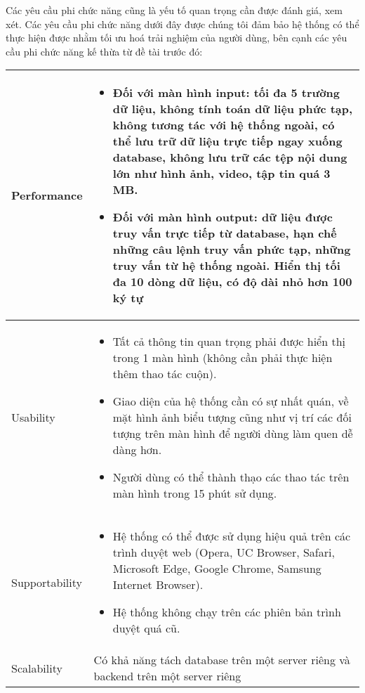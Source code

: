 Các yêu cầu phi chức năng cũng là yếu tố quan trọng cần được đánh giá, xem xét. Các yêu cầu phi chức năng dưới đây được chúng tôi đảm bảo hệ thống có thể thực hiện được nhằm tối ưu hoá trải nghiệm của người dùng, bên cạnh các yêu cầu phi chức năng kế thừa từ đề tài trước đó:
\begin{center}
    \begin{tabular}{ |m{3cm}|m{10cm}|}
\hline
    Performance & \begin{itemize}
        \item Đối với màn hình input: tối đa 5 trường dữ liệu, không tính toán dữ liệu phức tạp, không tương tác với hệ thống ngoài, có thể lưu trữ dữ liệu trực
tiếp ngay xuống database, không lưu trữ các tệp nội dung lớn như hình ảnh, video, tập tin quá 3 MB.
        \item Đối với màn hình output: dữ liệu được truy vấn trực tiếp từ database, hạn chế những câu lệnh truy vấn phức tạp, những truy vấn từ hệ thống ngoài.
Hiển thị tối đa 10 dòng dữ liệu, có độ dài nhỏ hơn 100 ký tự
    \end{itemize} \\
    \hline
    Usability  & \begin{itemize}
        \item Tất cả thông tin quan trọng phải được hiển thị trong 1 màn hình (không
cần phải thực hiện thêm thao tác cuộn).
        \item Giao diện của hệ thống cần có sự nhất quán, về mặt hình ảnh biểu tượng
cũng như vị trí các đối tượng trên màn hình để người dùng làm quen dễ
dàng hơn.
        \item Người dùng có thể thành thạo các thao tác trên màn hình trong 15 phút
sử dụng.
    \end{itemize} \\
    \hline
    Supportability & \begin{itemize}
        \item Hệ thống có thể được sử dụng hiệu quả trên các trình duyệt web (Opera,
UC Browser, Safari, Microsoft Edge, Google Chrome, Samsung Internet
Browser).
        \item Hệ thống không chạy trên các phiên bản trình duyệt quá cũ.
    \end{itemize} \\
    \hline
    Scalability & Có khả năng tách database trên một server riêng và backend trên một
server riêng \\
\hline
\end{tabular}
\end{center}
